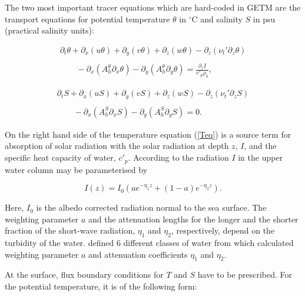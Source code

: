 The two most important tracer equations which are hard-coded in GETM
are the transport equations for potential temperature $\theta$ in $^{\circ}$C
and salinity $S$ in psu (practical salinity units):

\begin{equation}\label{Teq}
\begin{array}{l}
\partial_t \theta +\partial_x (u\theta) +\partial_y(v\theta) +\partial_z (w\theta)
-\partial_z(\nu_t' \partial_z \theta)
\\ \\ \displaystyle \qquad
-\partial_x(A_h^\theta \partial_x \theta)
-\partial_y(A_h^\theta \partial_y \theta)
=\frac{\partial_z I}{c'_p \rho_0},
\end{array} 
\end{equation}

\begin{equation}\label{Seq}
\begin{array}{l}
\partial_t S +\partial_x (uS) +\partial_y(vS) +\partial_z (wS)
-\partial_z(\nu_t' \partial_z S)
\\ \\ \displaystyle \qquad
-\partial_x(A_h^S \partial_x S)
-\partial_y(A_h^S \partial_y S)
=0.
\end{array} 
\end{equation}

On the right hand side of the temperature equation (\ref{Teq})
is a source term 
for absorption of solar radiation with the solar radiation at depth $z$,
$I$, and the specific heat capacity of water, $c'_p$. 
According to \cite{PAULSONea77} the radiation $I$ in the upper
water column may be parameterised by

\begin{equation}\label{Light}
I(z) = I_0 \left(ae^{-\eta_1z}+(1-a)e^{-\eta_2z}\right).
\end{equation}

Here, $I_0$ is the albedo corrected radiation normal to the sea surface.
The weighting parameter $a$ and the 
attenuation lengths for the
longer and the shorter fraction of the short-wave radiation,
$\eta_1$ and $\eta_2$, respectively, depend on the turbidity of the water.
\cite{JERLOV68} defined 6 different classes of water
from which \cite{PAULSONea77} calculated weighting parameter $a$
and attenuation coefficients $\eta_1$ and $\eta_2$.

At the surface, flux boundary conditions for $T$ and $S$ have to
be prescribed. For the potential temperature, it is of the following form:  

